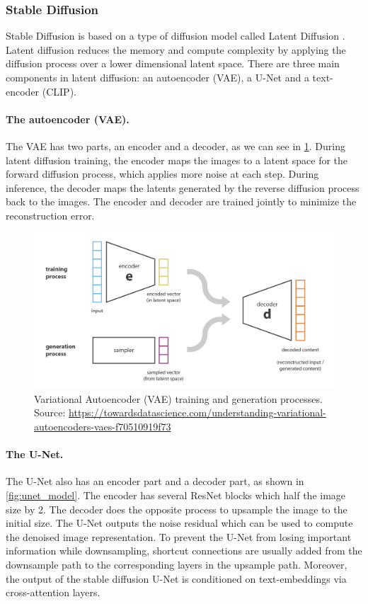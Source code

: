 \subsubsection{Stable Diffusion}

Stable Diffusion is based on a type of diffusion model called Latent Diffusion \cite{rombach2021highresolution}. Latent diffusion reduces the memory and compute complexity by applying the diffusion process over a lower dimensional latent space. There are three main components in latent diffusion: an autoencoder (VAE), a U-Net and a text-encoder (CLIP).

\paragraph{The autoencoder (VAE).} The VAE \cite{kingma2013auto} has two parts, an encoder and a decoder, as we can see in \cref{fig:vae}. During latent diffusion training, the encoder maps the images to a latent space for the forward diffusion process, which applies more noise at each step. During inference, the decoder maps the latents generated by the reverse diffusion process back to the images. The encoder and decoder are trained jointly to minimize the reconstruction error.

\begin{figure}[ht]
    \centering
    \includegraphics[width=\linewidth]{images/diffusion/vae.png}
    \caption{Variational Autoencoder (VAE) training and generation processes. Source: \url{https://towardsdatascience.com/understanding-variational-autoencoders-vaes-f70510919f73}}
    \label{fig:vae}
\end{figure}

\paragraph{The U-Net.} The U-Net \cite{ronneberger2015u} also has an encoder part and a decoder part, as shown in \cref{fig:unet_model}. The encoder has several ResNet blocks which half the image size by 2. The decoder does the opposite process to upsample the image to the initial size. The U-Net outputs the noise residual which can be used to compute the denoised image representation. To prevent the U-Net from losing important information while downsampling, shortcut connections are usually added from the downsample path to the corresponding layers in the upsample path. Moreover, the output of the stable diffusion U-Net is conditioned on text-embeddings via cross-attention layers.

